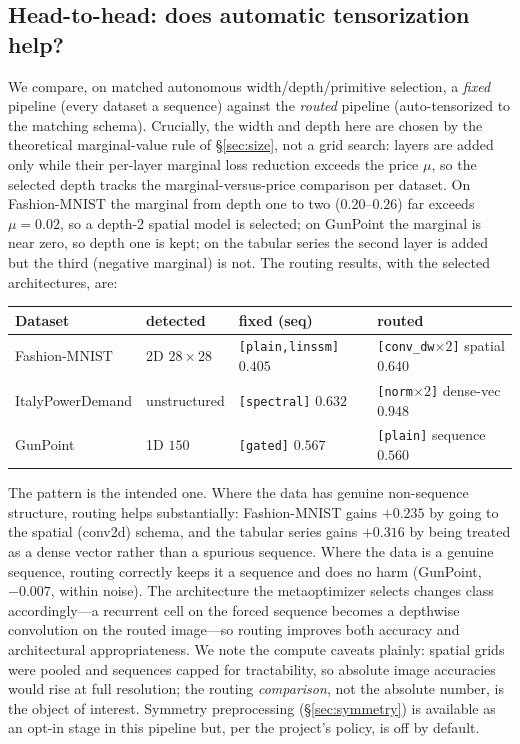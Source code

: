 \documentclass[11pt]{article}
\begin{document}
\subsection{Head-to-head: does automatic tensorization help?}
\label{sec:routinghead}

We compare, on matched autonomous width/depth/primitive selection, a \emph{fixed} pipeline (every
dataset a sequence) against the \emph{routed} pipeline (auto-tensorized to the matching schema).
Crucially, the width and depth here are chosen by the theoretical marginal-value rule of
\S\ref{sec:size}, not a grid search: layers are added only while their per-layer marginal loss
reduction exceeds the price $\mu$, so the selected depth tracks the marginal-versus-price comparison
per dataset. On Fashion-MNIST the marginal from depth one to two ($0.20$--$0.26$) far exceeds
$\mu=0.02$, so a depth-2 spatial model is selected; on GunPoint the marginal is near zero, so depth
one is kept; on the tabular series the second layer is added but the third (negative marginal) is
not. The routing results, with the selected architectures, are:
%
\begin{center}
\small
\begin{tabular}{llll}
\toprule
Dataset & detected & fixed (seq) & routed \\
\midrule
Fashion-MNIST    & 2D $28\times28$ & \texttt{[plain,linssm]} $0.405$ & \texttt{[conv\_dw$\times2$]} spatial $\mathbf{0.640}$ \\
ItalyPowerDemand & unstructured    & \texttt{[spectral]} $0.632$     & \texttt{[norm$\times2$]} dense-vec $\mathbf{0.948}$ \\
GunPoint         & 1D $150$        & \texttt{[gated]} $0.567$        & \texttt{[plain]} sequence $0.560$ \\
\bottomrule
\end{tabular}
\end{center}
%
The pattern is the intended one. Where the data has genuine non-sequence structure, routing helps
substantially: Fashion-MNIST gains $+0.235$ by going to the spatial (conv2d) schema, and the
tabular series gains $+0.316$ by being treated as a dense vector rather than a spurious sequence.
Where the data is a genuine sequence, routing correctly keeps it a sequence and does no harm
(GunPoint, $-0.007$, within noise). The architecture the metaoptimizer selects changes class
accordingly---a recurrent cell on the forced sequence becomes a depthwise convolution on the routed
image---so routing improves both accuracy and architectural appropriateness. We note the compute
caveats plainly: spatial grids were pooled and sequences capped for tractability, so absolute image
accuracies would rise at full resolution; the routing \emph{comparison}, not the absolute number, is
the object of interest. Symmetry preprocessing (\S\ref{sec:symmetry}) is available as an opt-in stage
in this pipeline but, per the project's policy, is off by default.
\end{document}
